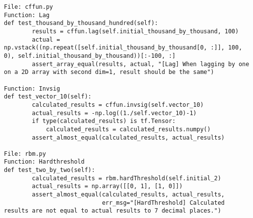 

\begin{minipage}{\linewidth}
\begin{lstlisting}[caption={examples of unit tests for different functions, labelled by the file and function which it refers to.}, label=code:unit_test_eg]
File: cffun.py
Function: Lag
def test_thousand_by_thousand_hundred(self):
        results = cffun.lag(self.initial_thousand_by_thousand, 100)
        actual = np.vstack((np.repeat([self.initial_thousand_by_thousand[0, :]], 100, 0), self.initial_thousand_by_thousand))[:-100, :]
        assert_array_equal(results, actual, "[Lag] When lagging by one on a 2D array with second dim=1, result should be the same")

Function: Invsig
def test_vector_10(self):
        calculated_results = cffun.invsig(self.vector_10)
        actual_results = -np.log((1./self.vector_10)-1)
        if type(calculated_results) is tf.Tensor:
            calculated_results = calculated_results.numpy()
        assert_almost_equal(calculated_results, actual_results)

File: rbm.py
Function: Hardthreshold
def test_two_by_two(self):
        calculated_results = rbm.hardThreshold(self.initial_2)
        actual_results = np.array([[0, 1], [1, 0]])
        assert_almost_equal(calculated_results, actual_results,
                            err_msg="[HardThreshold] Calculated results are not equal to actual results to 7 decimal places.")

\end{lstlisting}
\end{minipage}